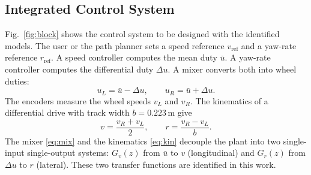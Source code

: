 \documentclass[conference]{IEEEtran}
\begin{document}
\subsection{Integrated Control System}
Fig.~\ref{fig:block} shows the control system to be designed with the
identified models. The user or the path planner sets a speed reference
$v_{\mathrm{ref}}$ and a yaw-rate reference $r_{\mathrm{ref}}$. A speed
controller computes the mean duty $\bar u$. A yaw-rate controller computes
the differential duty $\Delta u$. A mixer converts both into wheel duties:
\begin{equation}
u_L = \bar u - \Delta u, \qquad u_R = \bar u + \Delta u .
\label{eq:mix}
\end{equation}
The encoders measure the wheel speeds $v_L$ and $v_R$. The kinematics of a
differential drive with track width $b = 0.223$\,m give
\begin{equation}
v = \frac{v_R + v_L}{2}, \qquad r = \frac{v_R - v_L}{b} .
\label{eq:kin}
\end{equation}
The mixer \eqref{eq:mix} and the kinematics \eqref{eq:kin} decouple the
plant into two single-input single-output systems: $G_v(z)$ from $\bar u$
to $v$ (longitudinal) and $G_r(z)$ from $\Delta u$ to $r$ (lateral).
These two transfer functions are identified in this work.
\end{document}
